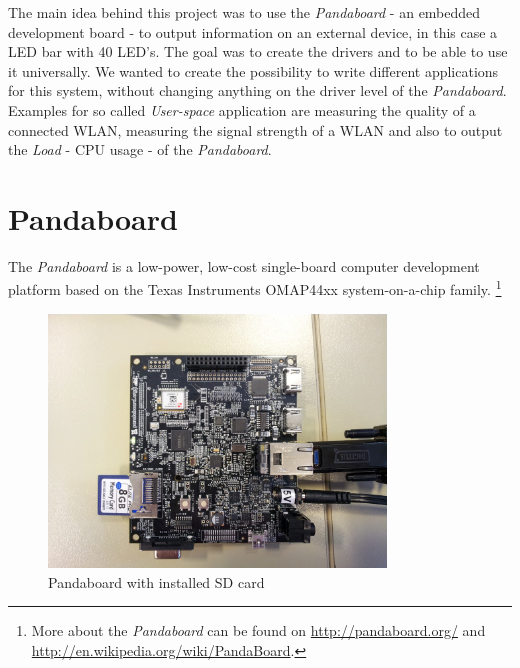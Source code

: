 The main idea behind this project was to use the \textit{Pandaboard} - an embedded development board - to output information on an external device, in this case a LED bar with 40 LED's. The goal was to create the drivers and to be able to use it universally. We wanted to create the possibility to write different applications for this system, without changing anything on the driver level of the \textit{Pandaboard}. 
Examples for so called \textit{User-space} application are measuring the quality of a connected WLAN, measuring the signal strength of a WLAN and also to output the \textit{Load} - CPU usage - of the \textit{Pandaboard}.

\section{Pandaboard}
The \textit{Pandaboard} is a low-power, low-cost single-board computer development platform based on the Texas Instruments OMAP44xx system-on-a-chip family. \footnote{More about the \textit{Pandaboard} can be found on \url{http://pandaboard.org/}  and  \url{http://en.wikipedia.org/wiki/PandaBoard}.}

\begin{figure}[H]
   \centering
   \includegraphics[width=0.8\textwidth]{img/Pandaboard_Alone.jpg}%
   \caption{Pandaboard with installed SD card}
   \label{fig:pandaBoard_Alone}%
\end{figure}

